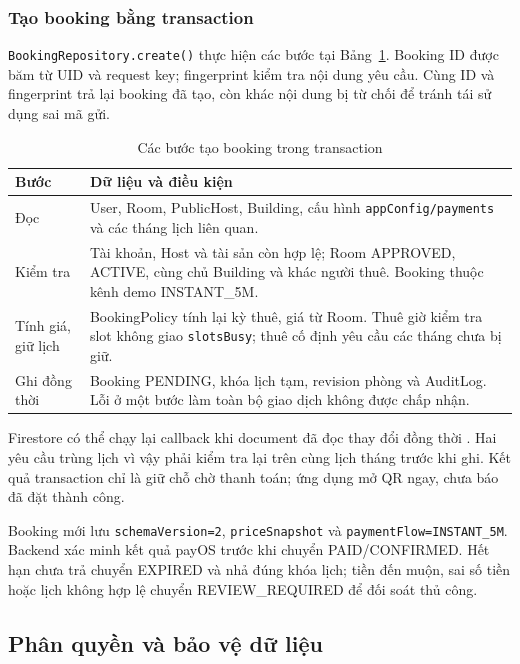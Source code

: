 \subsubsection{Tạo booking bằng transaction}
\texttt{BookingRepository.create()} thực hiện các bước tại Bảng~\ref{tab:ch4-transaction}. Booking ID được băm từ UID và request key; fingerprint kiểm tra nội dung yêu cầu. Cùng ID và fingerprint trả lại booking đã tạo, còn khác nội dung bị từ chối để tránh tái sử dụng sai mã gửi.

\begin{table}[H]\centering\small
\caption{Các bước tạo booking trong transaction}\label{tab:ch4-transaction}
\begin{tabularx}{\linewidth}{@{}p{2.7cm}X@{}}\toprule
Bước & Dữ liệu và điều kiện\\\midrule
Đọc & User, Room, PublicHost, Building, cấu hình \texttt{appConfig/payments} và các tháng lịch liên quan.\\
Kiểm tra & Tài khoản, Host và tài sản còn hợp lệ; Room APPROVED, ACTIVE, cùng chủ Building và khác người thuê. Booking thuộc kênh demo INSTANT\_5M.\\
Tính giá, giữ lịch & BookingPolicy tính lại kỳ thuê, giá từ Room. Thuê giờ kiểm tra slot không giao \texttt{slotsBusy}; thuê cố định yêu cầu các tháng chưa bị giữ.\\
Ghi đồng thời & Booking PENDING, khóa lịch tạm, revision phòng và AuditLog. Lỗi ở một bước làm toàn bộ giao dịch không được chấp nhận.\\
\bottomrule\end{tabularx}
\end{table}

Firestore có thể chạy lại callback khi document đã đọc thay đổi đồng thời \parencite{firebase_transaction}. Hai yêu cầu trùng lịch vì vậy phải kiểm tra lại trên cùng lịch tháng trước khi ghi. Kết quả transaction chỉ là giữ chỗ chờ thanh toán; ứng dụng mở QR ngay, chưa báo đã đặt thành công.

Booking mới lưu \texttt{schemaVersion=2}, \texttt{priceSnapshot} và \texttt{paymentFlow=INSTANT\_5M}. Backend xác minh kết quả payOS trước khi chuyển PAID/CONFIRMED. Hết hạn chưa trả chuyển EXPIRED và nhả đúng khóa lịch; tiền đến muộn, sai số tiền hoặc lịch không hợp lệ chuyển REVIEW\_REQUIRED để đối soát thủ công.

\subsection{Phân quyền và bảo vệ dữ liệu}
\label{sec:ch4-security}

